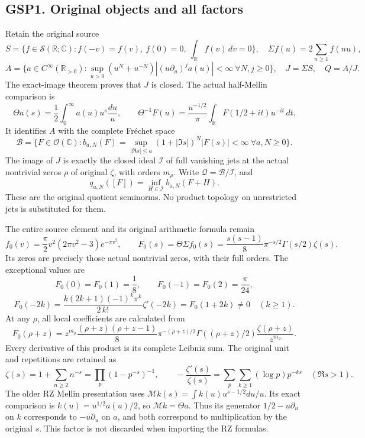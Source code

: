 \subsection{GSP1. Original objects and all
factors}\label{gsp1.-original-objects-and-all-factors}

Retain the original source \[
S=\{f\in\mathcal S(\mathbb R;\mathbb C):f(-v)=f(v),\ f(0)=0,
\ \int_{\mathbb R}f(v)\,dv=0\},
\quad \Sigma f(u)=2\sum_{n\ge1}f(nu),
\] \[
A=\{a\in C^\infty(\mathbb R_{>0}):
\sup_{u>0}(u^N+u^{-N})|(u\partial_u)^ja(u)|<\infty\ \forall N,j\ge0\},
\quad J=\Sigma S,\quad Q=A/J.
\tag{GSP1.1}
\] The exact-image theorem proves that \(J\) is closed. The actual
half-Mellin comparison is \[
\Theta a(s)=\frac12\int_0^\infty a(u)u^s\frac{du}{u},\qquad
\Theta^{-1}F(u)=\frac{u^{-1/2}}{\pi}
\int_{\mathbb R}F(1/2+it)u^{-it}\,dt.
\tag{GSP1.2}
\] It identifies \(A\) with the complete Fréchet space \[
\mathcal B=\{F\in\mathcal O(\mathbb C):
b_{a,N}(F)=\sup_{|\Re s|\le a}(1+|\Im s|)^N|F(s)|<\infty
\ \forall a,N\ge0\}.
\tag{GSP1.3}
\] The image of \(J\) is exactly the closed ideal \(\mathcal I\) of full
vanishing jets at the actual nontrivial zeros \(\rho\) of original
\(\zeta\), with orders \(m_\rho\). Write
\(\mathcal Q=\mathcal B/\mathcal I\), and \[
q_{a,N}([F])=\inf_{H\in\mathcal I}b_{a,N}(F+H).
\tag{GSP1.4}
\] These are the original quotient seminorms. No product topology on
unrestricted jets is substituted for them.

The entire source element and its original arithmetic formula remain \[
f_0(v)=\frac\pi2v^2(2\pi v^2-3)e^{-\pi v^2},\qquad
F_0(s)=\Theta\Sigma f_0(s)
=\frac{s(s-1)}8\pi^{-s/2}\Gamma(s/2)\zeta(s).
\tag{GSP1.5}
\] Its zeros are precisely those actual nontrivial zeros, with their
full orders. The exceptional values are \[
F_0(0)=F_0(1)=\frac18,\qquad F_0(-1)=F_0(2)=\frac\pi{24},
\] \[
F_0(-2k)=\frac{k(2k+1)(-1)^k\pi^k}{2\,k!}\zeta'(-2k)
=F_0(1+2k)\ne0\quad(k\ge1).
\tag{GSP1.6}
\] At any \(\rho\), all local coefficients are calculated from \[
F_0(\rho+z)=z^{m_\rho}
\frac{(\rho+z)(\rho+z-1)}8\pi^{-(\rho+z)/2}
\Gamma((\rho+z)/2)\frac{\zeta(\rho+z)}{z^{m_\rho}}.
\tag{GSP1.7}
\] Every derivative of this product is its complete Leibniz sum. The
original unit and repetitions are retained as \[
\zeta(s)=1+\sum_{n\ge2}n^{-s}=\prod_p(1-p^{-s})^{-1},\qquad
-\frac{\zeta'(s)}{\zeta(s)}=\sum_p\sum_{k\ge1}(\log p)p^{-ks}
\quad(\Re s>1).
\tag{GSP1.8}
\] The older RZ Mellin presentation uses
\(\mathcal Mk(s)=\int k(u)u^{s-1/2}du/u\). Its exact comparison is
\(k(u)=u^{1/2}a(u)/2\), so \(\mathcal Mk=\Theta a\). Thus its generator
\(1/2-u\partial_u\) on \(k\) corresponds to \(-u\partial_u\) on \(a\),
and both correspond to multiplication by the original \(s\). This factor
is not discarded when importing the RZ formulas.

